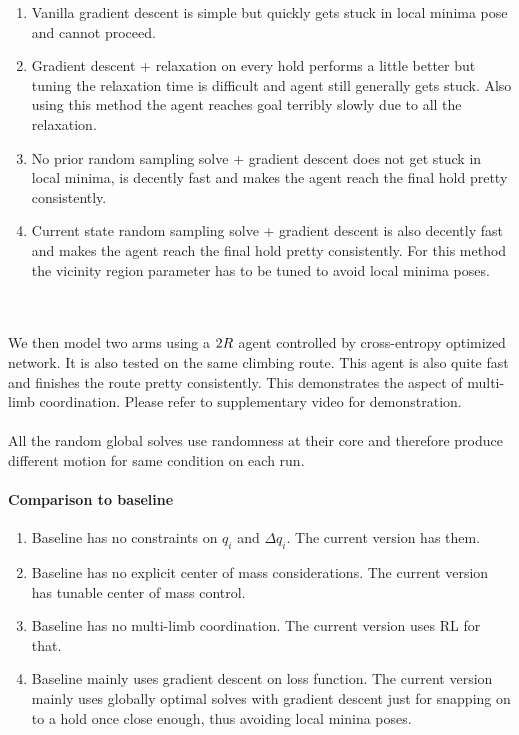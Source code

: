 \documentclass[12pt]{article}
\begin{document}
\begin{enumerate}[nolistsep]
    \item Vanilla gradient descent is simple but quickly gets stuck in local minima pose and cannot proceed.
    \item Gradient descent + relaxation on every hold performs a little better but tuning the relaxation time is difficult and agent still generally gets stuck. Also using this method the agent reaches goal terribly slowly due to all the relaxation.
    \item No prior random sampling solve + gradient descent does not get stuck in local minima, is decently fast and makes the agent reach the final hold pretty consistently.
    \item Current state random sampling solve + gradient descent is also decently fast and makes the agent reach the final hold pretty consistently. For this method the vicinity region parameter has to be tuned to avoid local minima poses.
\end{enumerate}
\\\\
We then model two arms using a $2 \time 2R$ agent controlled by cross-entropy optimized network.
It is also tested on the same climbing route.
This agent is also quite fast and finishes the route pretty consistently.
This demonstrates the aspect of multi-limb coordination.
Please refer to supplementary video for demonstration.
\\\\
All the random global solves use randomness at their core and therefore produce different motion for same condition on each run.
\paragraph{Comparison to baseline}
\begin{enumerate}[nolistsep]
    \item Baseline has no constraints on $q_i$ and $\Delta q_i$. The current version has them.
    \item Baseline has no explicit center of mass considerations. The current version has tunable center of mass control.
    \item Baseline has no multi-limb coordination. The current version uses RL for that.
    \item Baseline mainly uses gradient descent on loss function. The current version mainly uses globally optimal solves with gradient descent just for snapping on to a hold once close enough, thus avoiding local minina poses.
\end{enumerate}
\end{document}
